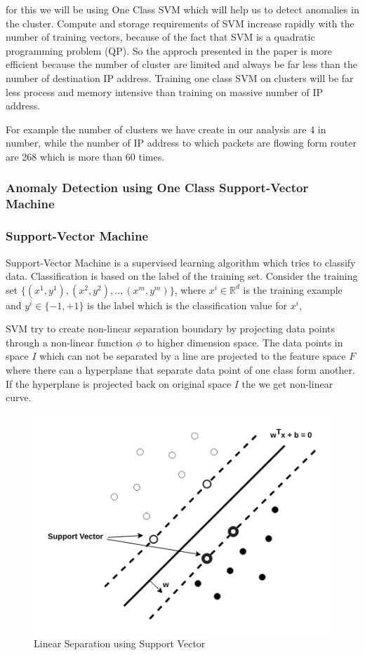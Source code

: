 \documentclass[10pt,oneside,a4paper]{article}
\begin{document}
for this we will be using One Class SVM which will help us to detect anomalies in the cluster. Compute and storage requirements of SVM increase rapidly with the number of training vectors, because of the fact that SVM is a quadratic programming problem (QP). So the approch presented in the paper is more efficient because the number of cluster are limited and always be far less than the number of destination IP address. Training one class SVM on clusters will be far less process and memory intensive than training on massive number of IP address.

For example the number of clusters we have create in our analysis are 4 in number, while the number of IP address to which packets are flowing form router are 268 which is more than 60 times.

\subsubsection{Anomaly Detection using One Class Support-Vector Machine}

\subsubsection{Support-Vector Machine}

Support-Vector Machine is a supervised learning algorithm which tries to classify data. Classification is based on the label of the training set. Consider the training set $\{(x^{1},y^{1}),(x^{2},y^{2}), .., (x^{m},y^{m})\}$, where $x^{i} \in \mathbb{R}^d$ is the training example and $y^{i} \in \{-1, +1\}$ is the label which is the classification value for $x^{i}$,

SVM try to create non-linear separation boundary by projecting data points through a non-linear function $\phi$ to higher dimension space. The data points in space $I$ which can not be separated by a line are projected to the feature space $F$ where there can a hyperplane that separate data point of one class form another. If the hyperplane is projected back on original space $I$ the we get non-linear curve.

\begin{figure}[H]
\centering
\includegraphics[scale=0.5]{SVM}
\caption{Linear Separation using Support Vector} \label{fig:SVM}
\end{figure}
\end{document}
